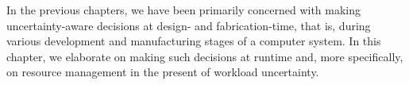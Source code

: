 In the previous chapters, we have been primarily concerned with making
uncertainty-aware decisions at design- and fabrication-time, that is, during
various development and manufacturing stages of a computer system. In this
chapter, we elaborate on making such decisions at runtime and, more
specifically, on resource management in the present of workload uncertainty.

\section{\introductiontitle}

\section{\problemtitle}

\section{\priortitle}

\section{\solutiontitle}

\section{\resultstitle}

\section{\conclusiontitle}
